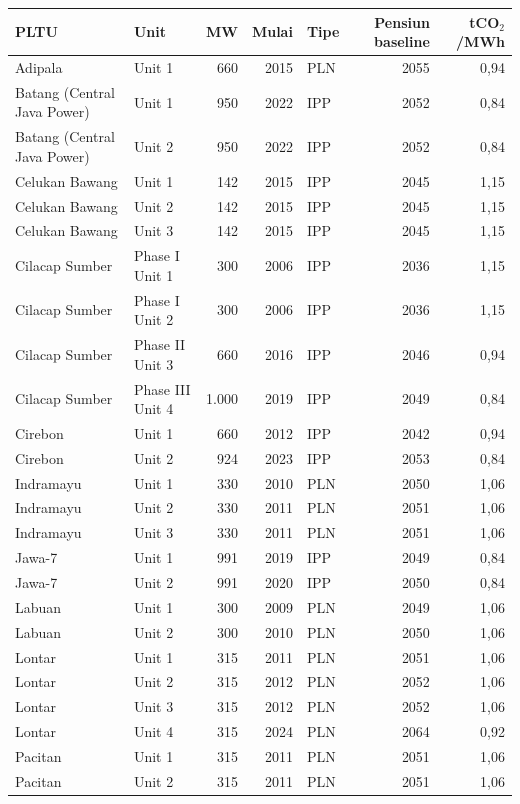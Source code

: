 \begin{longtable}{p{} p{} r r l r r}
\toprule
PLTU & Unit & MW & Mulai & Tipe & Pensiun baseline & tCO$_2$/MWh \\
\midrule
\endhead
Adipala & Unit 1 & 660 & 2015 & PLN & 2055 & 0,94 \\
Batang (Central Java Power) & Unit 1 & 950 & 2022 & IPP & 2052 & 0,84 \\
Batang (Central Java Power) & Unit 2 & 950 & 2022 & IPP & 2052 & 0,84 \\
Celukan Bawang & Unit 1 & 142 & 2015 & IPP & 2045 & 1,15 \\
Celukan Bawang & Unit 2 & 142 & 2015 & IPP & 2045 & 1,15 \\
Celukan Bawang & Unit 3 & 142 & 2015 & IPP & 2045 & 1,15 \\
Cilacap Sumber & Phase I Unit 1 & 300 & 2006 & IPP & 2036 & 1,15 \\
Cilacap Sumber & Phase I Unit 2 & 300 & 2006 & IPP & 2036 & 1,15 \\
Cilacap Sumber & Phase II Unit 3 & 660 & 2016 & IPP & 2046 & 0,94 \\
Cilacap Sumber & Phase III Unit 4 & 1.000 & 2019 & IPP & 2049 & 0,84 \\
Cirebon & Unit 1 & 660 & 2012 & IPP & 2042 & 0,94 \\
Cirebon & Unit 2 & 924 & 2023 & IPP & 2053 & 0,84 \\
Indramayu & Unit 1 & 330 & 2010 & PLN & 2050 & 1,06 \\
Indramayu & Unit 2 & 330 & 2011 & PLN & 2051 & 1,06 \\
Indramayu & Unit 3 & 330 & 2011 & PLN & 2051 & 1,06 \\
Jawa-7 & Unit 1 & 991 & 2019 & IPP & 2049 & 0,84 \\
Jawa-7 & Unit 2 & 991 & 2020 & IPP & 2050 & 0,84 \\
Labuan & Unit 1 & 300 & 2009 & PLN & 2049 & 1,06 \\
Labuan & Unit 2 & 300 & 2010 & PLN & 2050 & 1,06 \\
Lontar & Unit 1 & 315 & 2011 & PLN & 2051 & 1,06 \\
Lontar & Unit 2 & 315 & 2012 & PLN & 2052 & 1,06 \\
Lontar & Unit 3 & 315 & 2012 & PLN & 2052 & 1,06 \\
Lontar & Unit 4 & 315 & 2024 & PLN & 2064 & 0,92 \\
Pacitan & Unit 1 & 315 & 2011 & PLN & 2051 & 1,06 \\
Pacitan & Unit 2 & 315 & 2011 & PLN & 2051 & 1,06 \\

\end{longtable}

